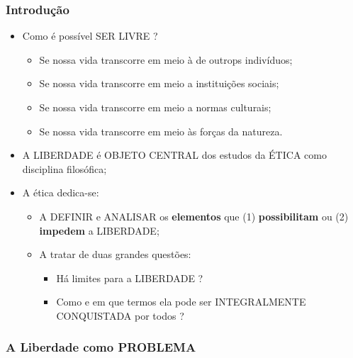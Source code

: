 \documentclass[
]{book}
\providecommand{\tightlist}{%
  \setlength{\itemsep}{0pt}\setlength{\parskip}{0pt}}
\begin{document}
\hypertarget{introduuxe7uxe3o}{%
\subsubsection{Introdução}\label{introduuxe7uxe3o}}

\begin{itemize}
\tightlist
\item
  Como é possível SER LIVRE ?

  \begin{itemize}
  \tightlist
  \item
    Se nossa vida transcorre em meio à de outrops indivíduos;
  \item
    Se nossa vida transcorre em meio a instituições sociais;
  \item
    Se nossa vida transcorre em meio a normas culturais;
  \item
    Se nossa vida transcorre em meio às forças da natureza.
  \end{itemize}
\item
  A LIBERDADE é OBJETO CENTRAL dos estudos da ÉTICA como disciplina filosófica;
\item
  A ética dedica-se:

  \begin{itemize}
  \tightlist
  \item
    A DEFINIR e ANALISAR os \textbf{elementos} que (1) \textbf{possibilitam} ou (2) \textbf{impedem} a LIBERDADE;
  \item
    A tratar de duas grandes questões:

    \begin{itemize}
    \tightlist
    \item
      Há limites para a LIBERDADE ?
    \item
      Como e em que termos ela pode ser INTEGRALMENTE CONQUISTADA por todos ?
    \end{itemize}
  \end{itemize}
\end{itemize}

\hypertarget{a-liberdade-como-problema}{%
\subsubsection{A Liberdade como PROBLEMA}\label{a-liberdade-como-problema}}
\end{document}
